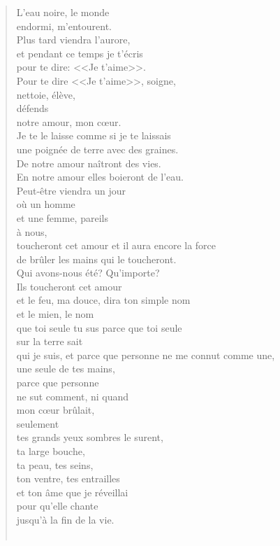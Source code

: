 \documentclass[11pt,a4paper]{book}
\begin{document}
\begin{verse}
L'eau noire, le monde \\
endormi, m'entourent. \\
Plus tard viendra l'aurore, \\
et pendant ce temps je t'écris \\
pour te dire: <<Je t'aime>>. \\
Pour te dire <<Je t'aime>>, soigne, \\
nettoie, élève, \\
défends \\
notre amour, mon c{\oe}ur. \\
Je te le laisse comme si je te laissais \\
une poignée de terre avec des graines. \\
De notre amour naîtront des vies. \\
En notre amour elles boieront de l'eau. \\
Peut-être viendra un jour \\
où un homme \\
et une femme, pareils \\
à nous, \\
toucheront cet amour et il aura encore la force \\
de brûler les mains qui le toucheront. \\
Qui avons-nous été? Qu'importe? \\
Ils toucheront cet amour \\
et le feu, ma douce, dira ton simple nom \\
et le mien, le nom \\
que toi seule tu sus parce que toi seule \\
sur la terre sait \\
qui je suis, et parce que personne ne me connut comme une, \\
une seule de tes mains, \\
parce que personne \\
ne sut comment, ni quand \\
mon c{\oe}ur brûlait, \\
seulement \\
tes grands yeux sombres le surent, \\
ta large bouche, \\
ta peau, tes seins, \\
ton ventre, tes entrailles \\
et ton âme que je réveillai \\
pour qu'elle chante \\
jusqu'à la fin de la vie. \\ \


\end{verse}
\end{document}

